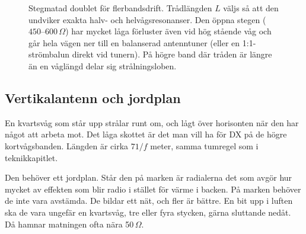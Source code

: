 \begin{figure}[H]
\caption{Stegmatad doublet för flerbandsdrift. Trådlängden $L$ väljs så att den
undviker exakta halv- och helvågsresonanser. Den öppna stegen ($450\text{--}600\,\Omega$)
har mycket låga förluster även vid hög stående våg och går hela vägen ner till
en balanserad antenntuner (eller en 1:1-strömbalun direkt vid tunern). På högre
band där tråden är längre än en våglängd delar sig strålningsloben.}
\label{fig:doublet}
\end{figure}

\subsection{Vertikalantenn och jordplan}

En kvartsvåg som står upp strålar runt om, och lågt över horisonten
när den har något att arbeta mot. Det låga skottet är det man vill ha
för DX på de högre kortvågsbanden. Längden är cirka $71/f$ meter,
samma tumregel som i teknikkapitlet.

Den behöver ett jordplan. Står den på marken är radialerna det som
avgör hur mycket av effekten som blir radio i stället för värme i
backen. På marken behöver de inte vara avstämda. De bildar ett nät,
och fler är bättre. En bit upp i luften ska de vara ungefär en
kvartsvåg, tre eller fyra stycken, gärna sluttande nedåt. Då hamnar
matningen ofta nära 50\,$\Omega$.

